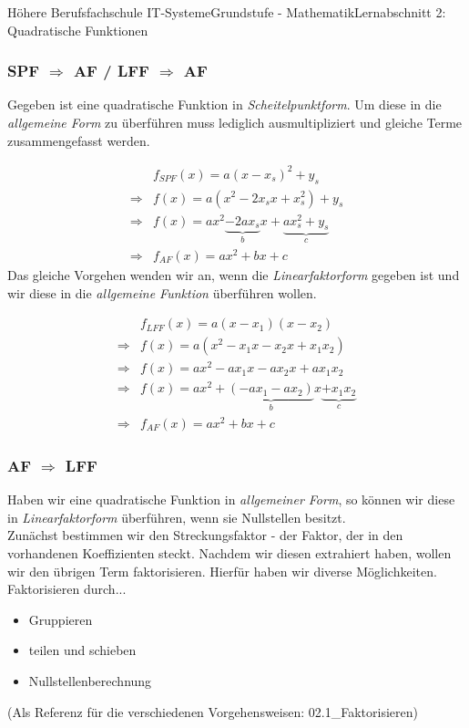 \documentclass[11pt,twocolumn,oneside,openany,headings=optiontotoc,11pt,numbers=noenddot]{article}
\begin{document}
\begin{worksheet}{Höhere Berufsfachschule IT-Systeme}{Grundstufe - Mathematik}{Lernabschnitt 2: Quadratische Funktionen}
		\subsubsection*{SPF \(\Rightarrow\) AF / LFF \(\Rightarrow\) AF}
		Gegeben ist eine quadratische Funktion in \textit{Scheitelpunktform}. Um diese in die \textit{allgemeine Form} zu überführen muss lediglich ausmultipliziert und gleiche Terme zusammengefasst werden.\\
		\par\noindent
		\begin{align*}
			& f_{SPF}(x) = a(x-x_s)^2+y_s\\
			\Rightarrow & f(x) = a(x^2-2x_sx +x_s^2) + y_s\\
			\Rightarrow & f(x) = ax^2 \underbrace{-2ax_s}_{b}x + \underbrace{ax_s^2+y_s}_{c}\\
			\Rightarrow & f_{AF}(x) = ax^2+bx+c
		\end{align*}
		Das gleiche Vorgehen wenden wir an, wenn die \textit{Linearfaktorform} gegeben ist und wir diese in die \textit{allgemeine Funktion} überführen wollen.\\
		\par\noindent
		\begin{align*}
			& f_{LFF}(x) = a(x-x_1)(x-x_2)\\
			\Rightarrow & f(x) = a(x^2-x_1x - x_2x +x_1x_2)\\
			\Rightarrow & f(x) = ax^2-ax_1x - ax_2x +ax_1x_2\\
			\Rightarrow & f(x) = ax^2 + \underbrace{(-ax_1-ax_2)}_{b}x \underbrace{+x_1x_2}_{c}\\
			\Rightarrow & f_{AF}(x) = ax^2+bx+c
		\end{align*}
		\subsubsection*{AF \(\Rightarrow\) LFF}
		Haben wir eine quadratische Funktion in \textit{allgemeiner Form}, so können wir diese in \textit{Linearfaktorform} überführen, wenn sie Nullstellen besitzt.\\
		Zunächst bestimmen wir den Streckungsfaktor - der Faktor, der in den vorhandenen Koeffizienten steckt. Nachdem wir diesen \grq{}extrahiert\grq{} haben, wollen wir den übrigen Term faktorisieren. Hierfür haben wir diverse Möglichkeiten. Faktorisieren durch...
		\begin{itemize}
			\item Gruppieren
			\item teilen und schieben
			\item Nullstellenberechnung 
		\end{itemize}
		\tiny{(Als Referenz für die verschiedenen Vorgehensweisen: 02.1\_Faktorisieren)}
		\normalsize

\end{worksheet}
\end{document}
